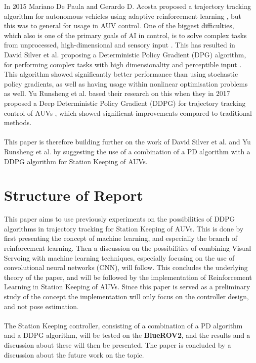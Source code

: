 In 2015 Mariano De Paula and Gerardo D. Acosta proposed a trajectory tracking algorithm for autonomous vehicles using adaptive reinforcement learning \cite{Paula}, but this was to general for usage in AUV control. One of the biggest difficulties, which also is one of the primary goals of AI in control, is to solve complex tasks from unprocessed, high-dimensional and sensory input \cite{Lillicrap}. This has resulted in David Silver et al. proposing a Deterministic Policy Gradient (DPG) algorithm, for performing complex tasks with high dimensionality and perceptible input \cite{David}. This algorithm showed significantly better performance than using stochastic policy gradients, as well as having usage within nonlinear optimisation problems as well. Yu Runsheng et al. based their research on this when they in 2017 proposed a Deep Deterministic Policy Gradient (DDPG) for trajectory tracking control of AUVs \cite{Yu}, which showed significant improvements compared to traditional methods.\\\\
This paper is therefore building further on the work of David Silver et al. and Yu Runsheng et al. by suggesting the use of a combination of a PD algorithm with a DDPG algorithm for Station Keeping of AUVs.   
\section{Structure of Report}
This paper aims to use previously experiments on the possibilities of DDPG algorithms in trajectory tracking for Station Keeping of AUVs. This is done by first presenting the concept of machine learning, and especially the branch of reinforcement learning. Then a discussion on the possibilities of combining Visual Servoing with machine learning techniques, especially focusing on the use of convolutional neural networks (CNN), will follow. This concludes the underlying theory of the paper, and will be followed by the implementation of Reinforcement Learning in Station Keeping of AUVs. Since this paper is served as a preliminary study of the concept the implementation will only focus on the controller design, and not pose estimation.\\\\
The Station Keeping controller, consisting of a combination of a PD algorithm and a DDPG algorithm, will be tested on the \textbf{BlueROV2}, and the results and a discussion about these will then be presented. The paper is concluded by a discussion about the future work on the topic. 
